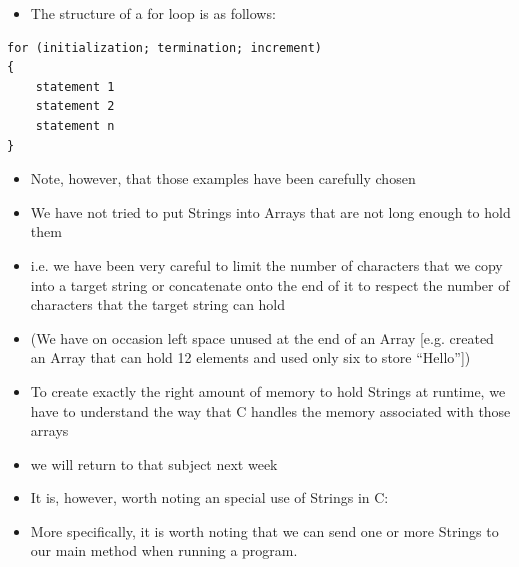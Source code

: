 \documentclass{beamer}
\begin{document}
\begin{frame}[fragile]
\begin{itemize}
\item The structure of a for loop is as follows:
\end{itemize}
\begin{block}{}
\begin{lstlisting}
for (initialization; termination; increment) 
{
	statement 1
	statement 2
	statement n
}
\end{lstlisting}
\end{block}
\end{frame}

\begin{frame}
\begin{itemize}
\item Note, however, that those examples have been carefully chosen
\item We have not tried to put Strings into Arrays that are not long enough to hold them 
\item i.e. we have been very careful to limit the number of characters that we copy into a target string or concatenate
onto the end of it to respect the number of characters that the target string can hold
\item (We have on occasion left space unused at the end of an Array [e.g. created an Array that can hold 12 elements and used only six to store ``Hello''])
\end{itemize}
\end{frame}

\begin{frame}
\begin{itemize}
\item To create exactly the right amount of memory to hold Strings at runtime, we have to understand the way that C handles the memory associated with those arrays
\item we will return to that subject next week

\end{itemize}
\end{frame}

\begin{frame}[fragile]
\begin{itemize}

\item It is, however, worth noting an special use of Strings in C:
\item More specifically, it is worth noting that we can send one or more Strings to our main method when running a
program.
\end{itemize}
\end{frame}
\end{document}
